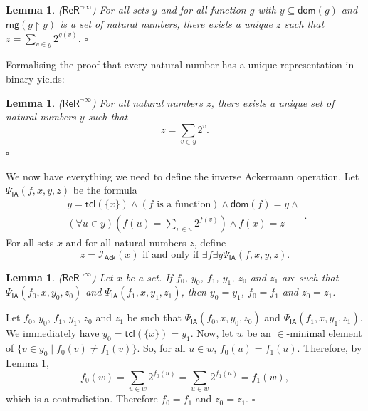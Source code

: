 \documentclass[11pt, a4paper]{article}
\newtheorem{lemma}[theorem]{Lemma}
\newenvironment{proof}[1][Proof]{\begin{trivlist}
\item[\hskip \labelsep {\bfseries #1}]}{\end{trivlist}}
\begin{document}
\begin{lemma} \label{Th:UniquenessOfPowerSum}
($\mathsf{ReR}^{\neg \infty}$) For all sets $y$ and for all function $g$ with $y \subseteq \mathsf{dom}(g)$ and $\mathsf{rng}(g \upharpoonright y)$ is a set of natural numbers, there exists a unique $z$ such that $z= \sum_{v \in y} 2^{g(v)}$. \hfill$\square$  
\end{lemma}

Formalising the proof that every natural number has a unique representation in binary yields:

\begin{lemma} \label{Th:BinaryRepresentation}
($\mathsf{ReR}^{\neg \infty}$) For all natural numbers $z$, there exists a unique set of natural numbers $y$ such that 
\[
z= \sum_{v \in y} 2^v.
\]
\hfill$\square$
\end{lemma}

We now have everything we need to define the inverse Ackermann operation. Let $\Psi_{\mathsf{IA}}(f, x, y, z)$ be the formula
\[
\begin{array}{c}
y= \mathsf{tcl}(\{x\}) \land (f \textrm{ is a function}) \land \mathsf{dom}(f)= y \land\\
(\forall u \in y)\left(f(u) = \sum_{v \in u} 2^{f(v)} \right) \land f(x)= z
\end{array}.
\]
For all sets $x$ and for all natural numbers $z$, define
\[
z= \mathcal{I}_{\mathsf{Ack}}(x) \textrm{ if and only if } \exists f \exists y \Psi_{\mathsf{IA}}(f, x, y, z).
\]

\begin{lemma} \label{Th:UniquenessOfInverseAckermann}
($\mathsf{ReR}^{\neg \infty}$) Let $x$ be a set. If $f_0$, $y_0$, $f_1$, $y_1$, $z_0$ and $z_1$ are such that $\Psi_{\mathsf{IA}}(f_0, x, y_0, z_0)$ and $\Psi_{\mathsf{IA}}(f_1, x, y_1, z_1)$, then $y_0=y_1$, $f_0=f_1$ and $z_0=z_1$.
\end{lemma}

\begin{proof}
Let $f_0$, $y_0$, $f_1$, $y_1$, $z_0$ and $z_1$ be such that $\Psi_{\mathsf{IA}}(f_0, x, y_0, z_0)$ and $\Psi_{\mathsf{IA}}(f_1, x, y_1, z_1)$. We immediately have $y_0= \mathsf{tcl}(\{x\})= y_1$. Now, let $w$ be an $\in$-minimal element of $\{v \in y_0 \mid f_0(v) \neq f_1(v)\}$. So, for all $u \in w$, $f_0(u)=f_1(u)$. Therefore, by Lemma \ref{Th:UniquenessOfPowerSum},
\[
f_0(w)= \sum_{u \in w} 2^{f_0(u)}= \sum_{u \in w} 2^{f_1(u)}= f_1(w),
\]
which is a contradiction. Therefore $f_0=f_1$ and $z_0=z_1$. \hfill$\square$ 
\end{proof}
\end{document}
